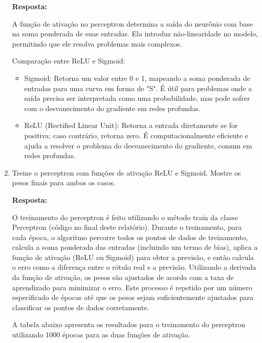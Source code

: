 \documentclass[12 pt]{article}
\begin{document}
\begin{enumerate}
    \textbf{Resposta:} \par

    A função de ativação no perceptron determina a saída do neurônio com base na soma ponderada de suas entradas. Ela introduz não-linearidade no modelo, permitindo que ele resolva problemas mais complexos.

    Comparação entre ReLU e Sigmoid:

    \begin{itemize}
        \item Sigmoid: Retorna um valor entre 0 e 1, mapeando a soma ponderada de entradas para uma curva em forma de "S". É útil para problemas onde a saída precisa ser interpretada como uma probabilidade, mas pode sofrer com o desvanecimento do gradiente em redes profundas.
        \item ReLU (Rectified Linear Unit): Retorna a entrada diretamente se for positiva; caso contrário, retorna zero. É computacionalmente eficiente e ajuda a resolver o problema do desvanecimento do gradiente, comum em redes profundas.
    \end{itemize}
    
    \item Treine o perceptron com funções de ativação ReLU e Sigmoid. Mostre os pesos finais para ambos os casos.\par

    \textbf{Resposta:} \par
    
    O treinamento do perceptron é feito utilizando o método train da classe Perceptron (código no final deste relatório). Durante o treinamento, para cada época, o algoritmo percorre todos os pontos de dados de treinamento, calcula a soma ponderada das entradas (incluindo um termo de bias), aplica a função de ativação (ReLU ou Sigmoid) para obter a previsão, e então calcula o erro como a diferença entre o rótulo real e a previsão. Utilizando a derivada da função de ativação, os pesos são ajustados de acordo com a taxa de aprendizado para minimizar o erro. Este processo é repetido por um número especificado de épocas até que os pesos sejam suficientemente ajustados para classificar os pontos de dados corretamente.

    A tabela abaixo apresenta os resultados para o treinamento do perceptron utilizando 1000 épocas para as duas funções de ativação.


\end{enumerate}
\end{document}
